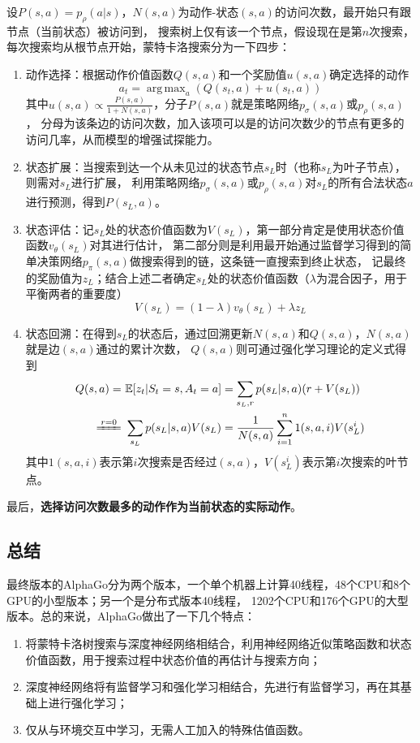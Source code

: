 \documentclass[12pt, a4paper, oneside]{ctexart}
\numberwithin{equation}{section}  %
\DeclareMathOperator*{\argmax}{arg\,max}  %
\def\E{\mathbb{E}}          %
\begin{document}
设$P(s,a) = p_{\rho}(a|s)$，$N(s,a)$为动作-状态$(s,a)$的访问次数，最开始只有跟节点（当前状态）被访问到，
搜索树上仅有该一个节点，假设现在是第$n$次搜索，每次搜索均从根节点开始，蒙特卡洛搜索分为一下四步：
\begin{enumerate}
    \item 动作选择：根据动作价值函数$Q(s,a)$和一个奖励值$u(s,a)$确定选择的动作
    \begin{equation*}
        a_t = \argmax_{a}(Q(s_t,a)+u(s_t,a))
    \end{equation*}
    其中$u(s,a)\propto \frac{P(s,a)}{1+N(s,a)}$，分子$P(s,a)$就是策略网络$p_\sigma(s,a)$或$p_{\rho}(s,a)$，
    分母为该条边的访问次数，加入该项可以是的访问次数少的节点有更多的访问几率，从而模型的增强试探能力。
    \item 状态扩展：当搜索到达一个从未见过的状态节点$s_L$时（也称$s_L$为叶子节点），则需对$s_L$进行扩展，
    利用策略网络$p_{\sigma}(s,a)$或$p_{\rho}(s,a)$对$s_L$的所有合法状态$a$进行预测，得到$P(s_L,a)$。
    \item 状态评估：记$s_L$处的状态价值函数为$V(s_L)$，第一部分肯定是使用状态价值函数$v_\theta(s_L)$对其进行估计，
    第二部分则是利用最开始通过监督学习得到的简单决策网络$p_\pi(s,a)$做搜索得到的链，这条链一直搜索到终止状态，
    记最终的奖励值为$z_L$；结合上述二者确定$s_L$处的状态价值函数（$\lambda$为混合因子，用于平衡两者的重要度）
    \begin{equation*}
        V(s_L) = (1-\lambda)v_\theta(s_L)+\lambda z_L
    \end{equation*}
    \item 状态回溯：在得到$s_L$的状态后，通过回溯更新$N(s,a)$和$Q(s,a)$，$N(s,a)$就是边$(s,a)$通过的累计次数，
    $Q(s,a)$则可通过强化学习理论的定义式得到
    \begin{align*}
        Q(s,a) =&\ \E[z_t|S_t=s,A_t=a] = \sum_{s_L, r}p(s_L|s,a)(r+V(s_L))\\
        \xlongequal{r=0}&\ \sum_{s_L}p(s_L|s,a)V(s_L) = \frac{1}{N(s,a)}\sum_{i=1}^n\mathrm{1}(s,a,i)V(s_L^i)
    \end{align*}
    其中$\mathrm{1}(s,a,i)$表示第$i$次搜索是否经过$(s,a)$，$V(s_L^i)$表示第$i$次搜索的叶节点。
\end{enumerate}
最后，\textbf{选择访问次数最多的动作作为当前状态的实际动作}。
\subsection{总结}
最终版本的AlphaGo分为两个版本，一个单个机器上计算40线程，48个CPU和8个GPU的小型版本；另一个是分布式版本40线程，
1202个CPU和176个GPU的大型版本。总的来说，AlphaGo做出了一下几个特点：
\begin{enumerate}
    \item 将蒙特卡洛树搜索与深度神经网络相结合，利用神经网络近似策略函数和状态价值函数，用于搜索过程中状态价值的再估计与搜索方向；
    \item 深度神经网络将有监督学习和强化学习相结合，先进行有监督学习，再在其基础上进行强化学习；
    \item 仅从与环境交互中学习，无需人工加入的特殊估值函数。
\end{enumerate}
\end{document}
